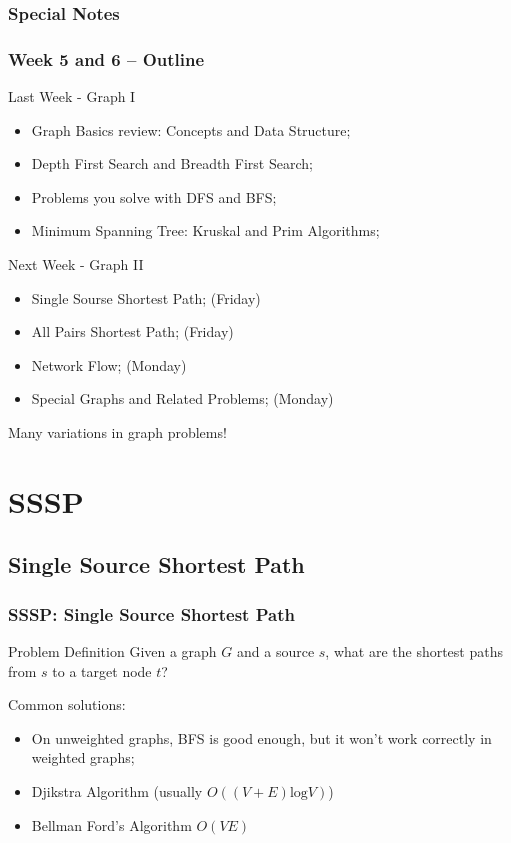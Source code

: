 \documentclass{beamer}
\begin{document}
\begin{frame}
  \frametitle{Special Notes}
  
\end{frame}

\begin{frame}
  \frametitle{Week 5 and 6 -- Outline}
  {\smaller
  \begin{block}{Last Week - Graph I}
    \begin{itemize}
    \item Graph Basics review: Concepts and Data Structure;
    \item Depth First Search and Breadth First Search;
    \item Problems you solve with DFS and BFS;
    \item Minimum Spanning Tree: Kruskal and Prim Algorithms;
     \end{itemize}
  \end{block}
  \begin{block}{Next Week - Graph II}
    \begin{itemize}
    \item Single Sourse Shortest Path; (Friday)
    \item All Pairs Shortest Path; (Friday)
    \item Network Flow; (Monday)
    \item Special Graphs and Related Problems; (Monday)
    \end{itemize}
  \end{block}}
  Many variations in graph problems!
\end{frame}

\section{SSSP}
\subsection{Single Source Shortest Path}
\begin{frame}
  \frametitle{SSSP: Single Source Shortest Path}
  {\smaller
    \begin{block}{Problem Definition}
      Given a graph $G$ and a source $s$, what
      are the shortest paths from $s$ to a target node $t$?
    \end{block}

    \bigskip

    Common solutions:

    \begin{itemize}
    \item On \alert{unweighted} graphs, BFS is good enough, but it
      won't work correctly in weighted graphs;
    \item Djikstra Algorithm (usually $O((V+E)\text{log}V)$)
    \item Bellman Ford's Algorithm $O(VE)$
    \end{itemize}
  }
\end{frame}
\end{document}
